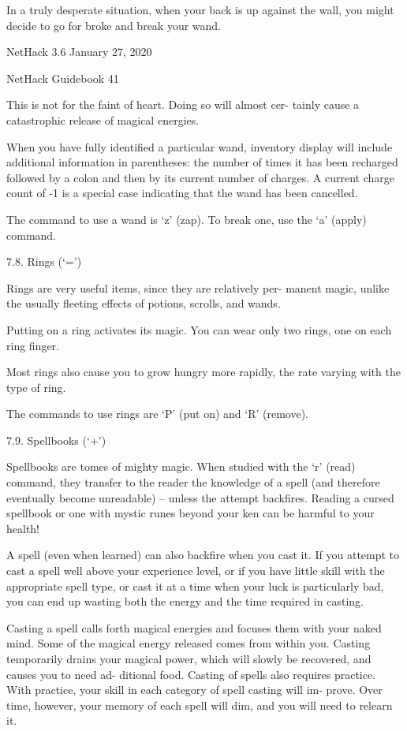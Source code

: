 \documentclass[11pt]{article}
\begin{document}
   In a truly desperate situation, when your back is up against
the wall, you might decide to go for broke and break your wand.


NetHack 3.6                   January 27, 2020





NetHack Guidebook                       41



This is not for the faint of heart. Doing so will almost cer-
tainly cause a catastrophic release of magical energies.

   When you have fully identified a particular wand, inventory
display will include additional information in parentheses: the
number of times it has been recharged followed by a colon and
then by its current number of charges. A current charge count of
-1 is a special case indicating that the wand has been cancelled.

   The command to use a wand is `z' (zap). To break one, use
the `a' (apply) command.

7.8. Rings (`=')

   Rings are very useful items, since they are relatively per-
manent magic, unlike the usually fleeting effects of potions,
scrolls, and wands.

   Putting on a ring activates its magic. You can wear only
two rings, one on each ring finger.

   Most rings also cause you to grow hungry more rapidly, the
rate varying with the type of ring.

The commands to use rings are `P' (put on) and `R' (remove).

7.9. Spellbooks (`+')

   Spellbooks are tomes of mighty magic. When studied with the
`r' (read) command, they transfer to the reader the knowledge of
a spell (and therefore eventually become unreadable) -- unless
the attempt backfires.  Reading a cursed spellbook or one with
mystic runes beyond your ken can be harmful to your health!

   A spell (even when learned) can also backfire when you cast
it.  If you attempt to cast a spell well above your experience
level, or if you have little skill with the appropriate spell
type, or cast it at a time when your luck is particularly bad,
you can end up wasting both the energy and the time required in
casting.

   Casting a spell calls forth magical energies and focuses
them with your naked mind. Some of the magical energy released
comes from within you. Casting temporarily drains your magical
power, which will slowly be recovered, and causes you to need ad-
ditional food.  Casting of spells also requires practice. With
practice, your skill in each category of spell casting will im-
prove.  Over time, however, your memory of each spell will dim,
and you will need to relearn it.
\end{document}
